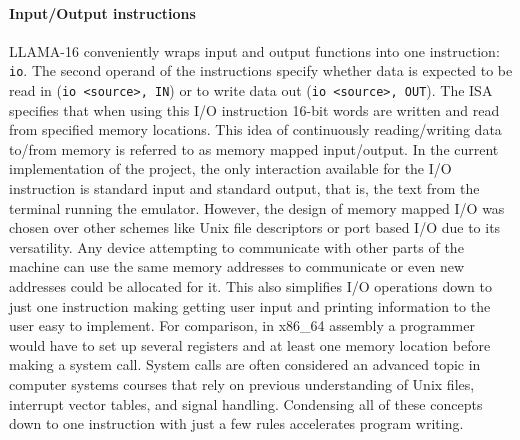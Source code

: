 \documentclass[man,hidelinks,floatsintext]{apa7}
\begin{document}
\paragraph{Input/Output instructions}
\label{sec:io}
LLAMA-16 conveniently wraps input and output functions into one instruction: \verb|io|. The second operand of the instructions specify whether data is expected to be read in (\verb|io <source>, IN|) or to write data out (\verb|io <source>, OUT|). The ISA specifies that when using this I/O instruction 16-bit words are written and read from specified memory locations. This idea of continuously reading/writing data to/from memory is referred to as memory mapped input/output. In the current implementation of the project, the only interaction available for the I/O instruction is standard input and standard output, that is, the text from the terminal running the emulator. However, the design of memory mapped I/O was chosen over other schemes like Unix file descriptors or port based I/O due to its versatility. Any device attempting to communicate with other parts of the machine can use the same memory addresses to communicate or even new addresses could be allocated for it. This also simplifies I/O operations down to just one instruction making getting user input and printing information to the user easy to implement. For comparison, in x86\_64 assembly a programmer would have to set up several registers and at least one memory location before making a system call. System calls are often considered an advanced topic in computer systems courses that rely on previous understanding of Unix files, interrupt vector tables, and signal handling. Condensing all of these concepts down to one instruction with just a few rules accelerates program writing.
\end{document}
